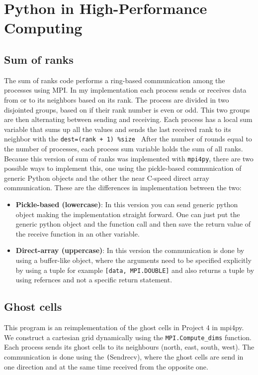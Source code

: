 \section{Python in High-Performance Computing}

\subsection{Sum of ranks}
The sum of ranks code performs a ring-based communication among the processes using MPI. In my implementation each process sends or receives data from or to its neighbors based on its rank. The process are divided in two disjointed groups, based on if their rank number is even or odd. This two groups are then alternating between sending and receiving. Each process has a local sum variable that sums up all the values and sends the last received rank to its neighbor with the \texttt{dest=(rank + 1) \%size
}  After the number of rounds equal to the number of processes, each process sum variable holds the sum of all ranks. Because this version of sum of ranks was implemented with \texttt{mpi4py}, there are two possible ways to implement this, one using the pickle-based communication of generic Python objects and the other the near C-speed direct array communication. These are the differences in implementation between the two:
\begin{itemize}
	\item \textbf{Pickle-based (lowercase)}: In this version you can send generic python object making the implementation straight forward. One can just put the generic python object and the function call and then save the return value of the receive function in an other variable.
	\item \textbf{Direct-array (uppercase)}: In this version the communication is done by using a buffer-like object, where the arguments need to be specified explicitly by using a tuple for example \texttt{[data, MPI.DOUBLE]} and also returns a tuple by using refernces and not a specific return statement. 
\end{itemize}

\subsection{Ghost cells}
This program is an reimplementation of the ghost cells in Project 4 in mpi4py. We construct a cartesian grid dynamically using the \texttt{MPI.Compute\_dims} function. Each process sends its ghost cells to its neighbours (north, east, south, west). The communication is done using the \texttt(Sendrecv), where the ghost cells are send in one direction and at the same time received from the opposite one.

